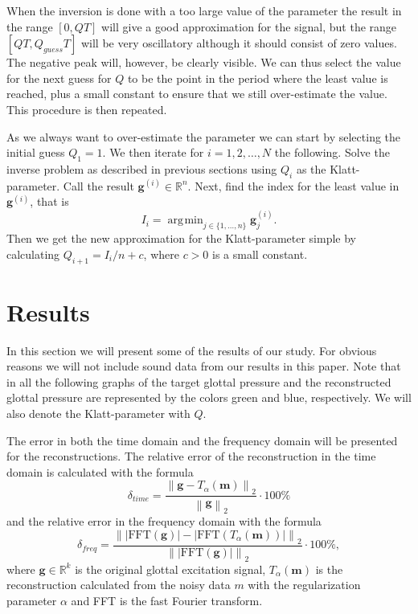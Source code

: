 \documentclass[12pt,a4]{article}
\DeclareMathOperator*{\argmin}{\arg\!\min}
\newcommand{\R}{{\mathbb R}}
\newcommand{\vc}[1]{\ensuremath{\bm{#1}}}
\begin{document}
When the inversion is done with a too large value of the parameter the result in the range $[0, QT]$ will give a good approximation for the signal, but the range $[QT, Q_{guess} T]$ will be very oscillatory although it should consist of zero values. The negative peak will, however, be clearly visible.  We can thus select the value for the next guess for $Q$ to be the point in the period where the least value is reached, plus a small constant to ensure that we still over-estimate the value. This procedure is then repeated.

As we always want to over-estimate the parameter we can start by selecting the initial guess $Q_1 = 1$. We then iterate for $i = 1, 2, \ldots, N$ the following. Solve the inverse problem as described in previous sections using $Q_i$ as the Klatt-parameter. Call the result $\vc{g}^{(i)} \in \R^n$. Next, find the index for the least value in $\vc{g}^{(i)}$, that is
\begin{equation*}
I_i = \argmin_{j \in \{1, \ldots, n\}} \vc{g}^{(i)}_j .
\end{equation*}
Then we get the new approximation for the Klatt-parameter simple by calculating $Q_{i+1} = I_i / n + c$, where $c > 0$ is a small constant.



\section{Results}
\label{sec:results}
In this section we will present some of the results of our study. For obvious reasons we will not include sound data from our results in this paper. Note that in all the following graphs of the target glottal pressure and the reconstructed glottal pressure are represented by the colors green and blue, respectively. We will also denote the Klatt-parameter with $Q$.

The error in both the time domain and the frequency domain will be presented for the reconstructions. The relative error of the reconstruction in the time domain is calculated with the formula
\begin{equation}
\delta_{time} = \frac{\left\| \vc{g} - T_{\alpha}(\vc{m}) \right\|_2}{\left\| \vc{g} \right\|_2} \cdot 100 \%
\end{equation}
and the relative error in the frequency domain with the formula
\begin{equation}
\delta_{freq} = \frac{\left\| \left|\text{FFT}\left(\vc{g}\right)\right| - \left|\text{FFT}\left(T_{\alpha}(\vc{m})\right)\right| \right\|_2}{\left\| \left|\text{FFT}\left(\vc{g}\right)\right| \right\|_2} \cdot 100 \% ,
\end{equation}
where $\vc{g} \in \R^k$ is the original glottal excitation signal, $T_{\alpha}(\vc{m})$ is the reconstruction calculated from the noisy data $m$ with the regularization parameter $\alpha$ and FFT is the fast Fourier transform.
\end{document}
